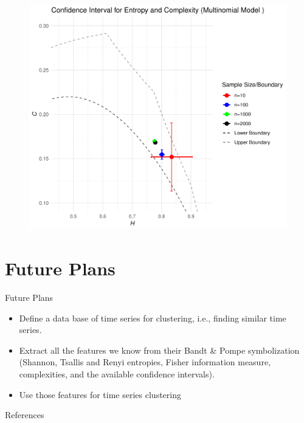 \documentclass{beamer}
\begin{document}
\begin{frame}
	\begin{figure}[hbt]
		\centering
		\includegraphics[width=0.8 \textwidth]{CI for Multinomial model}
	\end{figure}
\end{frame}

\section{Future Plans}

\begin{frame}{Future Plans}
    \begin{itemize}
        \item Define a data base of time series for clustering, i.e., finding similar time series.
        \item Extract all the features we know from their Bandt \& Pompe symbolization (Shannon, Tsallis and Renyi entropies, Fisher information measure, complexities, and the available confidence intervals).
        \item Use those features for time series clustering
    \end{itemize}
\end{frame}

\begin{frame}[allowframebreaks]{References}
    
    
    
\end{frame}
\end{document}
